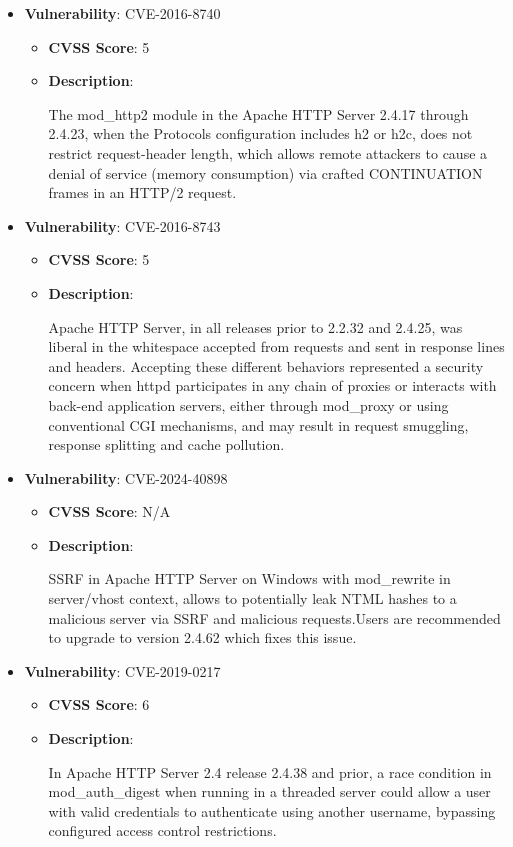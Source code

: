 \documentclass{article}
\begin{document}
\begin{itemize}
        \item \textbf{Vulnerability}: CVE-2016-8740
        \begin{itemize}
            \item \textbf{CVSS Score}:  5 
            \item \textbf{Description}:
            \parbox[t]{0.9\linewidth}{
                \ttfamily The mod\_http2 module in the Apache HTTP Server 2.4.17 through 2.4.23, when the Protocols configuration includes h2 or h2c, does not restrict request-header length, which allows remote attackers to cause a denial of service (memory consumption) via crafted CONTINUATION frames in an HTTP/2 request.
            }
        \end{itemize}
    
        \item \textbf{Vulnerability}: CVE-2016-8743
        \begin{itemize}
            \item \textbf{CVSS Score}:  5 
            \item \textbf{Description}:
            \parbox[t]{0.9\linewidth}{
                \ttfamily Apache HTTP Server, in all releases prior to 2.2.32 and 2.4.25, was liberal in the whitespace accepted from requests and sent in response lines and headers. Accepting these different behaviors represented a security concern when httpd participates in any chain of proxies or interacts with back-end application servers, either through mod\_proxy or using conventional CGI mechanisms, and may result in request smuggling, response splitting and cache pollution.
            }
        \end{itemize}
    
        \item \textbf{Vulnerability}: CVE-2024-40898
        \begin{itemize}
            \item \textbf{CVSS Score}:  N/A 
            \item \textbf{Description}:
            \parbox[t]{0.9\linewidth}{
                \ttfamily SSRF in Apache HTTP Server on Windows with mod\_rewrite in server/vhost context, allows to potentially leak NTML hashes to a malicious server via SSRF and malicious requests.Users are recommended to upgrade to version 2.4.62 which fixes this issue.
            }
        \end{itemize}
    
        \item \textbf{Vulnerability}: CVE-2019-0217
        \begin{itemize}
            \item \textbf{CVSS Score}:  6 
            \item \textbf{Description}:
            \parbox[t]{0.9\linewidth}{
                \ttfamily In Apache HTTP Server 2.4 release 2.4.38 and prior, a race condition in mod\_auth\_digest when running in a threaded server could allow a user with valid credentials to authenticate using another username, bypassing configured access control restrictions.
            }
        \end{itemize}
    

\end{itemize}
\end{document}
